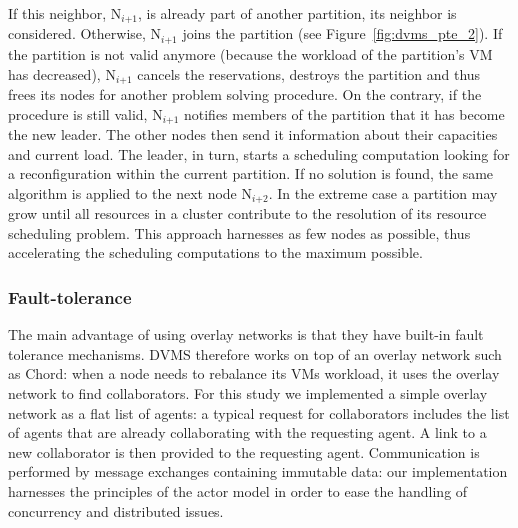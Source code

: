 If this neighbor, N\(_{\textit{i+1}}\),
is already part of another partition, its neighbor is considered.
Otherwise, N\(_{\textit{i+1}}\)
joins the partition (see Figure~\ref{fig:dvms_pte_2}).  If the
partition is not valid anymore (\eg because the workload of the
partition's VM has decreased), N\(_{\textit{i+1}}\)
cancels the reservations, destroys the partition and thus frees its
nodes for another problem solving procedure.
%
On the contrary, if the procedure is still valid, N\(_{\textit{i+1}}\)
notifies members of the partition that it has become the new
leader. The other nodes then send it information about their
capacities and current load. The leader, in turn, starts a scheduling
computation looking for a reconfiguration within the current
partition. If no solution is found, the same algorithm is applied to
the next node N\(_{\textit{i+2}}\).
In the extreme case a partition may grow until all resources in a
cluster contribute to the resolution of its resource scheduling
problem. This approach harnesses as few nodes as possible, thus
accelerating the scheduling computations to the maximum possible.


\subsubsection{Fault-tolerance}

The main advantage of using overlay networks is that they have
built-in fault tolerance mechanisms. DVMS therefore works on top of an
overlay network such as Chord: when a node needs to rebalance its VMs
workload, it uses the overlay network to find collaborators. For this
study we implemented a simple overlay network as a flat list of
agents: a typical request for collaborators includes the list of
agents that are already collaborating with the requesting agent. A
link to a new collaborator is then provided to the requesting
agent. Communication is performed by message exchanges containing
immutable data: our implementation harnesses the principles of the
actor model in order to ease the handling of concurrency and
distributed issues.

%

